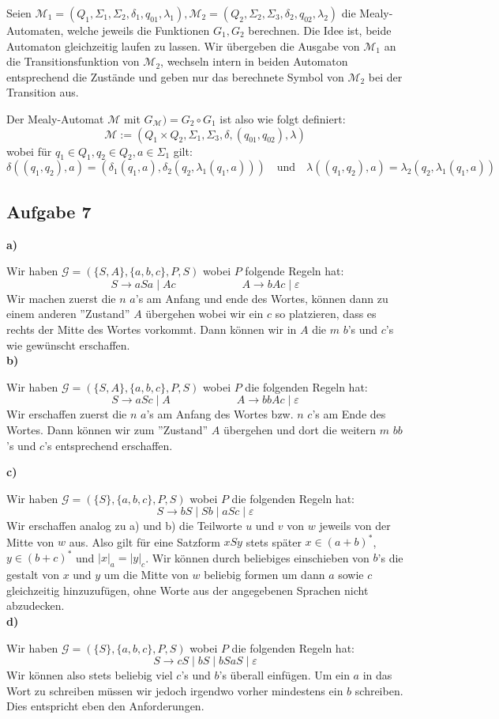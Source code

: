 \documentclass[a4paper,graphics,11pt]{article}
\newcommand{\aufgabe}[1]{\subsection*{Aufgabe #1}}
\begin{document}
Seien
$\mathcal{M}_1 = (Q_1, \Sigma_1, \Sigma_2, \delta_1, q_{01}, \lambda_1),
\mathcal{M}_2 = (Q_2, \Sigma_2, \Sigma_3, \delta_2, q_{02}, \lambda_2)$
die Mealy-Automaten, welche jeweils die Funktionen $G_1, G_2$ berechnen.
Die Idee ist, beide Automaton gleichzeitig laufen zu lassen.
Wir übergeben die Ausgabe von $\mathcal{M}_1$ an die Transitionsfunktion von $\mathcal{M_2}$, wechseln
intern in beiden Automaton entsprechend die Zustände und geben nur das berechnete Symbol von $\mathcal{M}_2$
bei der Transition aus.

Der Mealy-Automat $\mathcal{M}$ mit $G_{\mathcal{M}}) = G_2 \circ G_1$ ist also wie folgt definiert:
$$
    \mathcal{M} := (Q_1 \times Q_2, \Sigma_1, \Sigma_3, \delta, (q_{01}, q_{02}), \lambda)
$$
wobei für $q_1 \in Q_1, q_2 \in Q_2, a \in \Sigma_1$ gilt:
$$
    \delta((q_1,q_2), a) = (\delta_1(q_1, a), \delta_2(q_2, \lambda_1(q_1, a)))
    \quad\text{und}\quad
    \lambda((q_1,q_2), a) = \lambda_2(q_2, \lambda_1(q_1, a))
$$

\aufgabe{7}

\textbf{a)}

Wir haben $\mathcal{G} = (\{S,A\}, \{a,b,c\}, P, S)$ wobei $P$ folgende Regeln hat:
$$
    S \to aSa \mid Ac
    \qquad\qquad\qquad
    A \to bAc \mid \varepsilon
$$
Wir machen zuerst die $n$ $a$'s am Anfang und ende des Wortes, können dann zu einem anderen ''Zustand''
$A$ übergehen wobei wir ein $c$ so platzieren, dass es rechts der Mitte des Wortes vorkommt.
Dann können wir in $A$ die $m$ $b$'s und $c$'s wie gewünscht erschaffen.\\

\textbf{b)}

Wir haben $\mathcal{G} = (\{S, A\}, \{a,b,c\}, P, S)$ wobei $P$ die folgenden Regeln hat:
$$
    S \to aSc \mid A
    \qquad\qquad\qquad
    A \to bbAc \mid \varepsilon
$$
Wir erschaffen zuerst die $n$ $a$'s am Anfang des Wortes bzw. $n$ $c$'s am Ende des Wortes.
Dann können wir zum ''Zustand'' $A$ übergehen und dort die weitern $m$ $bb$'s und $c$'s
entsprechend erschaffen.

\newpage

\textbf{c)}

Wir haben $\mathcal{G} = (\{S\}, \{a,b,c\}, P, S)$ wobei $P$ die folgenden Regeln hat:
$$
    S \to bS \mid Sb \mid aSc \mid \varepsilon
$$
Wir erschaffen analog zu a) und b) die Teilworte $u$ und $v$ von $w$ jeweils von der Mitte von $w$ aus.
Also gilt für eine Satzform $xSy$ stets später $x \in (a+b)^*$, $y \in (b+c)^*$ und $|x|_a = |y|_c$.
Wir können durch beliebiges einschieben von $b$'s die gestalt von $x$ und $y$ um die Mitte von
$w$ beliebig formen um dann $a$ sowie $c$ gleichzeitig hinzuzufügen, ohne Worte aus der angegebenen
Sprachen nicht abzudecken.\\

\textbf{d)}

Wir haben $\mathcal{G} = (\{S\}, \{a,b,c\}, P, S)$ wobei $P$ die folgenden Regeln hat:
$$
    S \to cS \mid bS \mid bSaS \mid \varepsilon
$$
Wir können also stets beliebig viel $c$'s und $b$'s überall einfügen. Um ein $a$ in das Wort
zu schreiben müssen wir jedoch irgendwo vorher mindestens ein $b$ schreiben. Dies entspricht
eben den Anforderungen.
\end{document}
